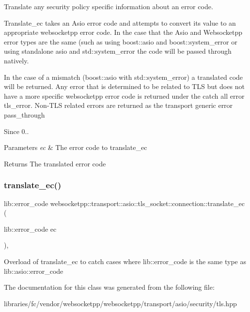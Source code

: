 Translate any security policy specific information about an error code. 

Translate\+\_\+ec takes an Asio error code and attempts to convert its value to an appropriate websocketpp error code. In the case that the Asio and Websocketpp error types are the same (such as using boost\+::asio and boost\+::system\+\_\+error or using standalone asio and std\+::system\+\_\+error the code will be passed through natively.

In the case of a mismatch (boost\+::asio with std\+::system\+\_\+error) a translated code will be returned. Any error that is determined to be related to T\+LS but does not have a more specific websocketpp error code is returned under the catch all error {\ttfamily tls\+\_\+error}. Non-\/\+T\+LS related errors are returned as the transport generic error {\ttfamily pass\+\_\+through}

\begin{DoxySince}{Since}
0..
\end{DoxySince}

\begin{DoxyParams}{Parameters}
{\em ec} & The error code to translate\+\_\+ec \\
\hline
\end{DoxyParams}
\begin{DoxyReturn}{Returns}
The translated error code 
\end{DoxyReturn}
\mbox{\label{classwebsocketpp_1_1transport_1_1asio_1_1tls__socket_1_1connection_a87860f93e9837fc0f86844bcf86ee83c}} 
\subsubsection{\texorpdfstring{translate\+\_\+ec()}{translate\_ec()}\hspace{0.1cm}{\footnotesize\ttfamily [2/2]}}
{\footnotesize\ttfamily lib\+::error\+\_\+code websocketpp\+::transport\+::asio\+::tls\+\_\+socket\+::connection\+::translate\+\_\+ec (\begin{DoxyParamCaption}\item[{lib\+::error\+\_\+code}]{ec }\end{DoxyParamCaption})\hspace{0.3cm}{\ttfamily [inline]}, {\ttfamily [protected]}}

Overload of translate\+\_\+ec to catch cases where lib\+::error\+\_\+code is the same type as lib\+::asio\+::error\+\_\+code 

The documentation for this class was generated from the following file\+:\begin{DoxyCompactItemize}
\item 
libraries/fc/vendor/websocketpp/websocketpp/transport/asio/security/tls.\+hpp\end{DoxyCompactItemize}
